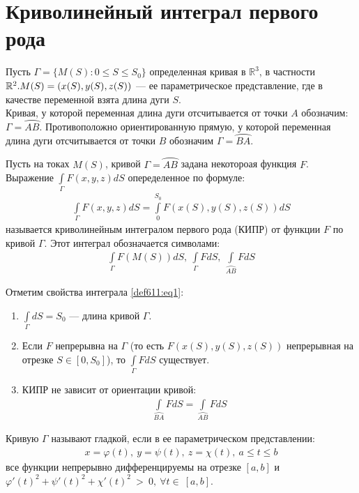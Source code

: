 \section{Криволинейный интеграл первого рода}
Пусть $\Gamma = \{M(S) : 0 \leq S \leq S_0\}$ определенная кривая в
$\mathbb{R}^3$, в частности $\mathbb{R}^2. \\ M(S) = (x(S), y(S), z(S))$ --- ее
параметрическое представление, где в качестве переменной взята длина дуги $S$.
\\
Кривая, у которой переменная длина дуги отсчитывается от точки $A$
обозначим: $\Gamma = \wideparen{AB}$. Противоположно ориентированную прямую, у
которой переменная длина дуги отсчитывается от точки $B$ обозначим $\Gamma =
\wideparen{BA}$.

\begin{definition}
  Пусть на токах $M(S)$, кривой $\Gamma = \wideparen{AB}$ задана некотороая
  функция $F$. Выражение $\int\limits_\Gamma F(x, y, z) dS$ опеределенное по
  формуле:
  \begin{gather}
    \int\limits_\Gamma F(x, y, z) dS = \int\limits_0^{S_0} F(x(S), y(S), z(S))
    dS
    \label{def611:eq1}
  \end{gather}
  называется криволинейным интегралом первого рода (КИПР) от функции $F$ по
  кривой $\Gamma$. Этот интеграл обозначается символами:
  \begin{gather*}
    \int\limits_\Gamma F(M(S)) dS, \ \int\limits_\Gamma F dS, \
    \int\limits_{\wideparen{AB}} FdS
  \end{gather*}
\end{definition}

Отметим свойства интеграла \eqref{def611:eq1}:
\begin{enumerate}
  \item $\int\limits_\Gamma dS = S_0$ --- длина кривой $\Gamma$.
  \item Если $F$ непрерывна на $\Gamma$ (то есть $F(x(S), y(S), z(S))$
    непрерывная на отрезке $S \in [0, S_0]$), то $\int\limits_\Gamma FdS$
    существует.
  \item КИПР не зависит от ориентации кривой:
    \begin{gather*}
      \int\limits_{\wideparen{BA}} FdS = \int\limits_{\wideparen{AB}} FdS
    \end{gather*}
\end{enumerate}

\begin{definition}
  Кривую $\Gamma$ называют гладкой, если в ее параметрическом представлении:
  \begin{gather}
    x = \varphi(t), \ y = \psi(t), \ z = \chi(t), \ a \leq t \leq b
    \label{def612:eq2}
  \end{gather}
  все функции непрерывно дифференцируемы на отрезке $[a, b]$ и $\varphi'(t)^2 +
  \psi'(t)^2 + \chi'(t)^2~>~0, \ \forall t \in~[a, b]$.
\end{definition}

